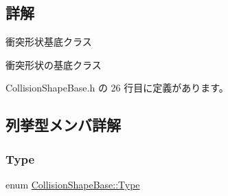 \subsection{詳解}
衝突形状基底クラス 

衝突形状の基底クラス 

 Collision\+Shape\+Base.\+h の 26 行目に定義があります。



\subsection{列挙型メンバ詳解}
\mbox{\label{class_collision_shape_base_a8abcef092855ad0ca191047044b002cb}} 
\subsubsection{\texorpdfstring{Type}{Type}}
{\footnotesize\ttfamily enum \mbox{\hyperlink{class_collision_shape_base_a8abcef092855ad0ca191047044b002cb}{Collision\+Shape\+Base\+::\+Type}}}

